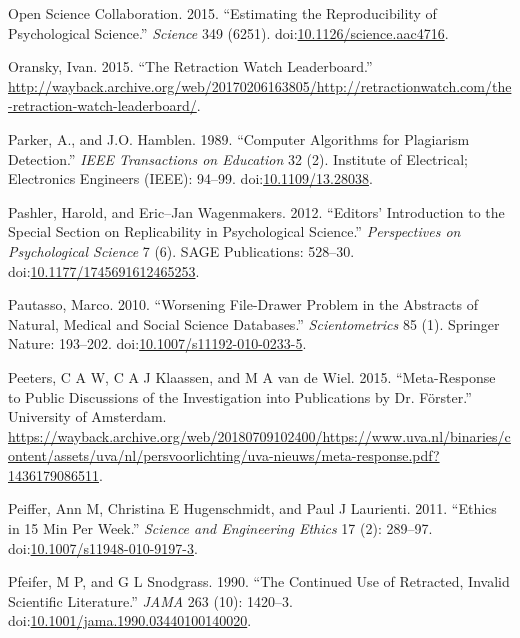 \documentclass[a5paper]{book}
\begin{document}
\hypertarget{ref-doi:10.1126ux2fscience.aac4716}{}
Open Science Collaboration. 2015. ``Estimating the Reproducibility of
Psychological Science.'' \emph{Science} 349 (6251).
doi:\href{https://doi.org/10.1126/science.aac4716}{10.1126/science.aac4716}.

\hypertarget{ref-oransky2015}{}
Oransky, Ivan. 2015. ``The Retraction Watch Leaderboard.''
\url{http://wayback.archive.org/web/20170206163805/http://retractionwatch.com/the-retraction-watch-leaderboard/}.

\hypertarget{ref-doi:10.1109ux2f13.28038}{}
Parker, A., and J.O. Hamblen. 1989. ``Computer Algorithms for Plagiarism
Detection.'' \emph{IEEE Transactions on Education} 32 (2). Institute of
Electrical; Electronics Engineers (IEEE): 94--99.
doi:\href{https://doi.org/10.1109/13.28038}{10.1109/13.28038}.

\hypertarget{ref-doi:10.1177ux2f1745691612465253}{}
Pashler, Harold, and Eric--Jan Wagenmakers. 2012. ``Editors'
Introduction to the Special Section on Replicability in Psychological
Science.'' \emph{Perspectives on Psychological Science} 7 (6). SAGE
Publications: 528--30.
doi:\href{https://doi.org/10.1177/1745691612465253}{10.1177/1745691612465253}.

\hypertarget{ref-doi:10.1007ux2fs11192-010-0233-5}{}
Pautasso, Marco. 2010. ``Worsening File-Drawer Problem in the Abstracts
of Natural, Medical and Social Science Databases.''
\emph{Scientometrics} 85 (1). Springer Nature: 193--202.
doi:\href{https://doi.org/10.1007/s11192-010-0233-5}{10.1007/s11192-010-0233-5}.

\hypertarget{ref-peeters2015}{}
Peeters, C A W, C A J Klaassen, and M A van de Wiel. 2015.
``Meta-Response to Public Discussions of the Investigation into
Publications by Dr. Förster.'' University of Amsterdam.
\url{https://wayback.archive.org/web/20180709102400/https://www.uva.nl/binaries/content/assets/uva/nl/persvoorlichting/uva-nieuws/meta-response.pdf?1436179086511}.

\hypertarget{ref-doi:10.1007ux2fs11948-010-9197-3}{}
Peiffer, Ann M, Christina E Hugenschmidt, and Paul J Laurienti. 2011.
``Ethics in 15 Min Per Week.'' \emph{Science and Engineering Ethics} 17
(2): 289--97.
doi:\href{https://doi.org/10.1007/s11948-010-9197-3}{10.1007/s11948-010-9197-3}.

\hypertarget{ref-doi:10.1001ux2fjama.1990.03440100140020}{}
Pfeifer, M P, and G L Snodgrass. 1990. ``The Continued Use of Retracted,
Invalid Scientific Literature.'' \emph{JAMA} 263 (10): 1420--3.
doi:\href{https://doi.org/10.1001/jama.1990.03440100140020}{10.1001/jama.1990.03440100140020}.
\end{document}
